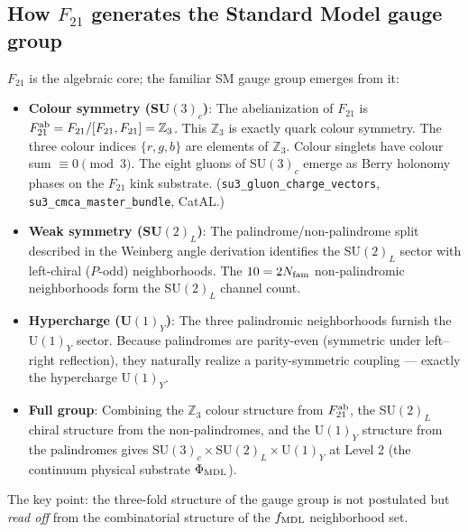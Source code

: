 \documentclass[11pt,a4paper]{article}
\newcommand{\Nfam}{N_{\rm fam}}
\newcommand{\lean}[1]{\texttt{#1}}
\begin{document}
\subsection{How $F_{21}$ generates the Standard Model gauge group}

$F_{21}$ is the algebraic core; the familiar SM gauge group emerges from it:

\begin{itemize}
  \item \textbf{Colour symmetry (SU$(3)_c$)}: The abelianization of $F_{21}$ is
        $F_{21}^{\rm ab} = F_{21}/[F_{21},F_{21}] = \mathbb{Z}_3$.
        This $\mathbb{Z}_3$ is exactly quark colour symmetry.  The three colour
        indices $\{r,g,b\}$ are elements of $\mathbb{Z}_3$.  Colour singlets have
        colour sum $\equiv 0 \pmod{3}$.  The eight gluons of SU$(3)_c$ emerge
        as Berry holonomy phases on the $F_{21}$ kink substrate.
        (\lean{su3\_gluon\_charge\_vectors}, \lean{su3\_cmca\_master\_bundle}, CatAL.)

  \item \textbf{Weak symmetry (SU$(2)_L$)}: The palindrome/non-palindrome split
        described in the Weinberg angle derivation identifies the SU$(2)_L$ sector
        with left-chiral ($P$-odd) neighborhoods.  The $10 = 2\Nfam$ non-palindromic
        neighborhoods form the SU$(2)_L$ channel count.

  \item \textbf{Hypercharge (U$(1)_Y$)}: The three palindromic neighborhoods
        furnish the U$(1)_Y$ sector.  Because palindromes are parity-even
        (symmetric under left--right reflection), they naturally realize a
        parity-symmetric coupling — exactly the hypercharge U$(1)_Y$.

  \item \textbf{Full group}: Combining the $\mathbb{Z}_3$ colour structure from
        $F_{21}^{\rm ab}$, the SU$(2)_L$ chiral structure from the non-palindromes,
        and the U$(1)_Y$ structure from the palindromes gives
        $\mathrm{SU}(3)_c \times \mathrm{SU}(2)_L \times \mathrm{U}(1)_Y$
        at Level 2 (the continuum physical substrate $\Phi_{\rm MDL}$).
\end{itemize}

\noindent
The key point: the three-fold structure of the gauge group is not postulated
but \emph{read off} from the combinatorial structure of the $f_{\rm MDL}$
neighborhood set.

\end{document}
